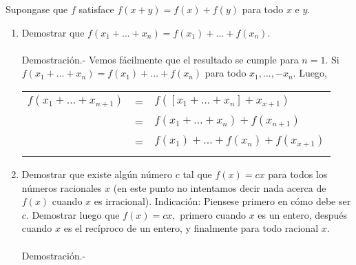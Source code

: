 \begin{teo}
Supongase que $f$ satisface $f(x+y) = f(x) + f(y)$ para todo $x$ \; e \; $y$.
\begin{enumerate}[\bfseries a)]
\item Demostrar que $f(x_1 +...+ x_n) = f(x_1) + ... + f(x_n).$\\\\
Demostración.- \; Vemos fácilmente que el resultado se cumple para $n=1$. Si $f(x_1 + ... + x_n) = f(x_1)+...+f(x_n)$ para todo $x_1,...,-x_n.$ Luego,
\begin{center}
\begin{tabular}{r c l}
$f(x_1 + ... + x_{n+1})$&=&$f\left( [x_1 + ... + x_n] + x_{x+1} \right)$\\
&=&$f(x_1 + ... + x_n) + f(x_{n+1})$\\
&=&$f(x_1) +...+ f(x_n) + f(x_{x+1})$\\\\
\end{tabular}
\end{center}

\item Demostrar que existe algún número $c$ tal que $f(x) = cx$ para todos los números racionales $x$ (en este punto no intentamos decir nada acerca de $f(x)$ cuando $x$ es irracional). Indicación: Piensese primero en cómo debe ser $c.$ Demostrar luego que $f(x) = cx,$ primero cuando $x$ es un entero, después cuando $x$ es el recíproco de un entero, y finalmente para todo racional $x$.\\\\
Demostración.- \; 

\end{enumerate}
\end{teo}


